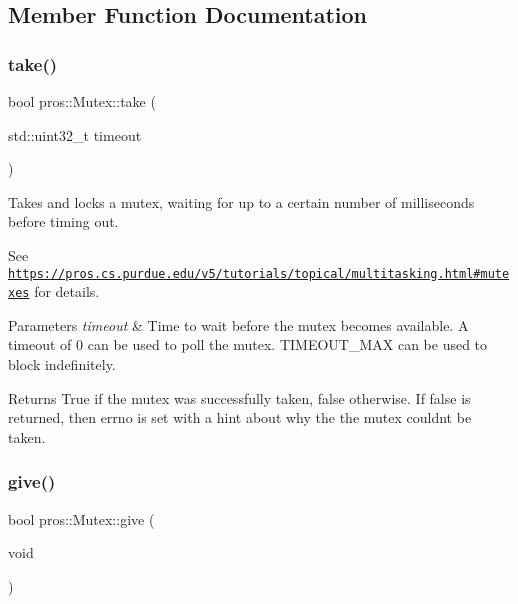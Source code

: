 \subsection{Member Function Documentation}
\mbox{\label{classpros_1_1Mutex_a70da733375f7b4b68475881578c78516}} 
\subsubsection{\texorpdfstring{take()}{take()}}
{\footnotesize\ttfamily bool pros\+::\+Mutex\+::take (\begin{DoxyParamCaption}\item[{std\+::uint32\+\_\+t}]{timeout }\end{DoxyParamCaption})}



Takes and locks a mutex, waiting for up to a certain number of milliseconds before timing out. 

See \href{https://pros.cs.purdue.edu/v5/tutorials/topical/multitasking.html#mutexes}{\tt https\+://pros.\+cs.\+purdue.\+edu/v5/tutorials/topical/multitasking.\+html\#mutexes} for details.


\begin{DoxyParams}{Parameters}
{\em timeout} & Time to wait before the mutex becomes available. A timeout of 0 can be used to poll the mutex. T\+I\+M\+E\+O\+U\+T\+\_\+\+M\+AX can be used to block indefinitely.\\
\hline
\end{DoxyParams}
\begin{DoxyReturn}{Returns}
True if the mutex was successfully taken, false otherwise. If false is returned, then errno is set with a hint about why the the mutex couldn\textquotesingle{}t be taken. 
\end{DoxyReturn}
\mbox{\label{classpros_1_1Mutex_a1c3e7ee193608a27a5a509ee7930363b}} 
\subsubsection{\texorpdfstring{give()}{give()}}
{\footnotesize\ttfamily bool pros\+::\+Mutex\+::give (\begin{DoxyParamCaption}\item[{void}]{ }\end{DoxyParamCaption})}



